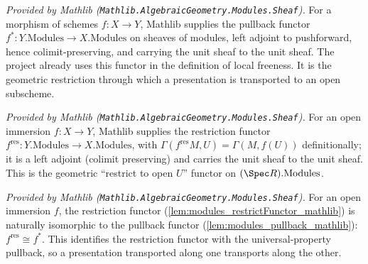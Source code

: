



\begin{lemma}
  \label{lem:modules_pullback_mathlib}
  \mathlibok
  \textit{Provided by Mathlib (\texttt{Mathlib.AlgebraicGeometry.Modules.Sheaf}).}
  For a morphism of schemes \(f : X \to Y\), Mathlib supplies the pullback functor
  \(f^{*} : Y.\mathrm{Modules} \to X.\mathrm{Modules}\) on sheaves of modules, left adjoint to
  pushforward, hence colimit-preserving, and carrying the unit sheaf to the unit sheaf. The project
  already uses this functor in the definition of local freeness. It is the geometric restriction
  through which a presentation is transported to an open subscheme.
\end{lemma}

\begin{lemma}
  \label{lem:modules_restrictFunctor_mathlib}
  \mathlibok
  \textit{Provided by Mathlib (\texttt{Mathlib.AlgebraicGeometry.Modules.Sheaf}).}
  For an open immersion \(f : X \to Y\), Mathlib supplies the restriction functor
  \(f^{\mathrm{res}} : Y.\mathrm{Modules} \to X.\mathrm{Modules}\), with
  \(\Gamma(f^{\mathrm{res}} M, U) = \Gamma(M, f(U))\) definitionally; it is a left adjoint (colimit
  preserving) and carries the unit sheaf to the unit sheaf. This is the geometric
  ``restrict to open \(U\)'' functor on \((\Spec R).\mathrm{Modules}\).
\end{lemma}

\begin{lemma}
  \label{lem:modules_restrictFunctorIsoPullback_mathlib}
  \mathlibok
  \textit{Provided by Mathlib (\texttt{Mathlib.AlgebraicGeometry.Modules.Sheaf}).}
  For an open immersion \(f\), the restriction functor (\cref{lem:modules_restrictFunctor_mathlib})
  is naturally isomorphic to the pullback functor (\cref{lem:modules_pullback_mathlib}):
  \(f^{\mathrm{res}} \cong f^{*}\). This identifies the restriction functor with the
  universal-property pullback, so a presentation transported along one transports along the other.
\end{lemma}


